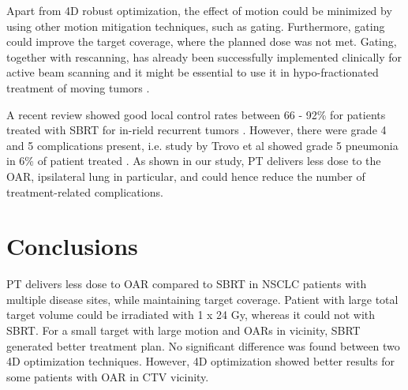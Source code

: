 \documentclass[type=dr, dr=rernat, accentcolor=tud7b,colorbacktitle, bigchapter, openright, twoside, 12pt ]{tudthesis}
\begin{document}
Apart from 4D robust optimization, the effect of motion could be minimized by using other motion mitigation techniques, such as gating. Furthermore, gating could improve the target coverage, where the planned dose was
not met. Gating, together with rescanning, has already been successfully implemented clinically for active beam scanning \cite{Rossi2016, Mori2016} and it might be essential to use it in hypo-fractionated 
treatment of moving tumors \cite{Richter2014}.

A recent review showed good local control rates between 66 - 92\% for patients treated with SBRT for in-rield recurrent tumors \cite{Amini2014}. 
However, there were grade 4 and 5 complications present, i.e. study by Trovo et al showed grade 5 pneumonia in
6\% of patient treated \cite{Trovo2014}. As shown in our study, PT delivers less dose to the OAR, ipsilateral lung in particular, and could hence reduce the number of treatment-related
complications.

\section{Conclusions}

PT delivers less dose to OAR compared to SBRT in NSCLC patients with multiple disease sites, while maintaining target coverage. Patient with large total target volume 
could be irradiated with 1 x 24 Gy, whereas it could not with SBRT. For a small target with large motion and OARs in vicinity, 
SBRT generated better treatment plan. 
No significant difference was found between two 4D optimization techniques. However, 4D optimization showed better results for some patients with OAR in CTV vicinity.



{}
% 
\end{document}
